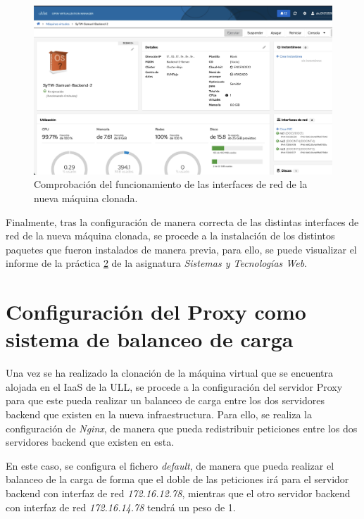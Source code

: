 \documentclass{report}
\begin{document}
  \begin{figure}[H]
    \raggedright
    \includegraphics[scale=0.4]{Capturas/Informe-P3-STW/Nuevo-servidor-backend.jpeg}
    \caption{Comprobación del funcionamiento de las interfaces de red de la nueva máquina clonada.}
    \label{fig:Clonado-4}
  \end{figure}

  Finalmente, tras la configuración de manera correcta de las distintas interfaces de red de la nueva máquina clonada, se procede a la instalación de los distintos paquetes que fueron instalados de manera previa, para ello, se puede visualizar el informe de la práctica \href{https://drive.google.com/file/d/1hmTNhYU0AJ1pRHuNVUaLL7Eal5yHOkge/view?usp=drive_link}{2} de la asignatura \emph{Sistemas y Tecnologías Web}.

  \chapter{Configuración del Proxy como sistema de balanceo de carga}
  Una vez se ha realizado la clonación de la máquina virtual que se encuentra alojada en el IaaS de la ULL, se procede a la configuración del servidor Proxy para que este pueda realizar un balanceo de carga entre los dos servidores backend que existen en la nueva infraestructura. Para ello, se realiza la configuración de \emph{Nginx}, de manera que pueda redistribuir peticiones entre los dos servidores backend que existen en esta.

  En este caso, se configura el fichero \emph{default}, de manera que pueda realizar el balanceo de la carga de forma que el doble de las peticiones irá para el servidor backend con interfaz de red \emph{172.16.12.78}, mientras que el otro servidor backend con interfaz de red \emph{172.16.14.78} tendrá un peso de 1.
\end{document}
